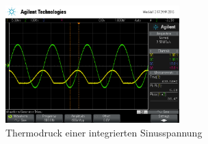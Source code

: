 \begin{figure}
	\centering
	\includegraphics[width=0.6\textwidth]{img/scope_3_int_sin.png}
	\caption{Thermodruck einer integrierten Sinusspannung}
	\label{fig:intsin}
\end{figure}
